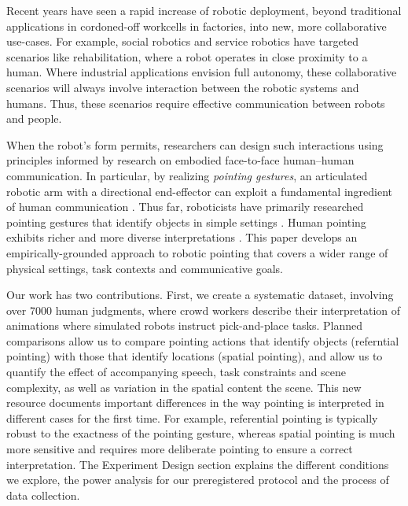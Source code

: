 Recent years have seen a rapid increase of robotic deployment, beyond traditional applications in cordoned-off workcells in factories, into new, more collaborative use-cases. For example, social robotics and service robotics have targeted scenarios like rehabilitation, where a robot operates in close proximity to a human. Where industrial applications envision full autonomy, these collaborative scenarios will always involve interaction between the robotic systems and humans. Thus, these scenarios require effective communication between robots and people.

When the robot's form permits, researchers can design such interactions using principles informed by research on embodied face-to-face human--human communication.  In particular, by realizing \emph{pointing gestures}, an articulated robotic arm with a directional end-effector can exploit a fundamental ingredient of human communication \cite{kita2003pointing}.  Thus far, roboticists have primarily researched pointing gestures that identify objects in simple settings \cite[a.o.]{han2018placing,holladay2014legible,zhao2016experimental}.  Human pointing exhibits richer and more diverse interpretations \cite{kendon:2004}.  This paper develops an empirically-grounded approach to robotic pointing that covers a wider range of physical settings, task contexts and communicative goals.

Our work has two contributions.  First, we create a systematic dataset, involving over 7000 human judgments, where crowd workers describe their interpretation of animations where simulated robots instruct pick-and-place tasks.  Planned comparisons allow us to compare pointing actions that identify objects (referntial pointing) with those that identify locations (spatial pointing), and allow us to quantify the effect of accompanying speech, task constraints and scene complexity, as well as variation in the spatial content the scene.  This new resource documents important differences in the way pointing is interpreted in different cases for the first time.  For example, referential pointing is typically robust to the exactness of the pointing gesture, whereas spatial pointing is much more sensitive and requires more deliberate pointing to ensure a correct interpretation.  The Experiment Design section explains the different conditions we explore, the power analysis for our preregistered protocol and the process of data collection. 

